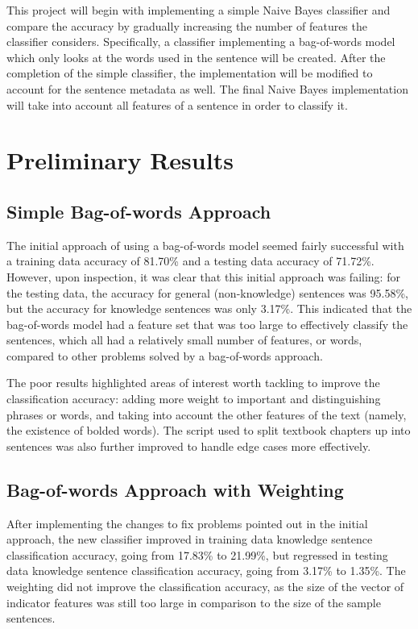 \documentclass{article} %
\begin{document}
This project will begin with implementing a simple Naive Bayes classifier and compare the accuracy by gradually increasing the number of features the classifier considers. Specifically, a classifier implementing a bag-of-words model which only looks at the words used in the sentence will be created. After the completion of the simple classifier, the implementation will be modified to account for the sentence metadata as well. The final Naive Bayes implementation will take into account all features of a sentence in order to classify it.

\section{Preliminary Results}

\subsection{Simple Bag-of-words Approach}

The initial approach of using a bag-of-words model seemed fairly successful with a training data accuracy of 81.70\% and a testing data accuracy of 71.72\%. However, upon inspection, it was clear that this initial approach was failing: for the testing data, the accuracy for general (non-knowledge) sentences was 95.58\%, but the accuracy for knowledge sentences was only 3.17\%. This indicated that the bag-of-words model had a feature set that was too large to effectively classify the sentences, which all had a relatively small number of features, or words, compared to other problems solved by a bag-of-words approach.

The poor results highlighted areas of interest worth tackling to improve the classification accuracy: adding more weight to important and distinguishing phrases or words, and taking into account the other features of the text (namely, the existence of bolded words). The script used to split textbook chapters up into sentences was also further improved to handle edge cases more effectively.

\subsection{Bag-of-words Approach with Weighting}

After implementing the changes to fix problems pointed out in the initial approach, the new classifier improved in training data knowledge sentence classification accuracy, going from 17.83\% to 21.99\%, but regressed in testing data knowledge sentence classification accuracy, going from 3.17\% to 1.35\%. The weighting did not improve the classification accuracy, as the size of the vector of indicator features was still too large in comparison to the size of the sample sentences.
\end{document}
